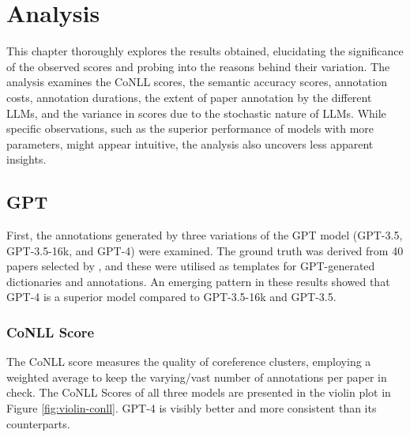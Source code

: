 \chapter{Analysis}\label{chapter:analysis}

This chapter thoroughly explores the results obtained, elucidating the significance of the observed scores and probing into the reasons behind their variation. The analysis examines the CoNLL scores, the semantic accuracy scores, annotation costs, annotation durations, the extent of paper annotation by the different \ac{LLMs}, and the variance in scores due to the stochastic nature of \ac{LLMs}. While specific observations, such as the superior performance of models with more parameters, might appear intuitive, the analysis also uncovers less apparent insights.

\section{GPT}
First, the annotations generated by three variations of the GPT model (GPT-3.5, GPT-3.5-16k, and GPT-4) were examined. The ground truth was derived from 40 papers selected by \citet{asakura2022building}, and these were utilised as templates for GPT-generated dictionaries and annotations. An emerging pattern in these results showed that GPT-4 is a superior model compared to GPT-3.5-16k and GPT-3.5. 

\subsection{CoNLL Score}
The CoNLL score measures the quality of coreference clusters, employing a weighted average to keep the varying/vast number of annotations per paper in check. The CoNLL Scores of all three models are presented in the violin plot in Figure \ref{fig:violin-conll}. GPT-4 is visibly better and more consistent than its counterparts.

